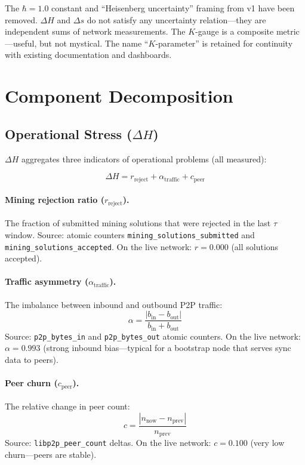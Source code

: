 \documentclass[11pt,a4paper]{article}
\begin{document}
\begin{honesty}
The $\hbar = 1.0$ constant and ``Heisenberg uncertainty'' framing from v1 have been removed. $\Delta H$ and $\Delta s$ do not satisfy any uncertainty relation---they are independent sums of network measurements. The $K$-gauge is a composite metric---useful, but not mystical. The name ``$K$-parameter'' is retained for continuity with existing documentation and dashboards.
\end{honesty}

\section{Component Decomposition}

\subsection{Operational Stress ($\Delta H$)}

$\Delta H$ aggregates three indicators of operational problems (\textcolor{measured}{all measured}):

\begin{equation}
\Delta H = r_{\text{reject}} + \alpha_{\text{traffic}} + c_{\text{peer}}
\end{equation}

\paragraph{Mining rejection ratio ($r_{\text{reject}}$).} The fraction of submitted mining solutions that were rejected in the last $\tau$ window. Source: atomic counters \texttt{mining\_solutions\_submitted} and \texttt{mining\_solutions\_accepted}. On the live network: $r = 0.000$ (all solutions accepted).

\paragraph{Traffic asymmetry ($\alpha_{\text{traffic}}$).} The imbalance between inbound and outbound P2P traffic:
\[
\alpha = \frac{|b_{\text{in}} - b_{\text{out}}|}{b_{\text{in}} + b_{\text{out}}}
\]
Source: \texttt{p2p\_bytes\_in} and \texttt{p2p\_bytes\_out} atomic counters. On the live network: $\alpha = 0.993$ (strong inbound bias---typical for a bootstrap node that serves sync data to peers).

\paragraph{Peer churn ($c_{\text{peer}}$).} The relative change in peer count:
\[
c = \frac{|n_{\text{now}} - n_{\text{prev}}|}{n_{\text{prev}}}
\]
Source: \texttt{libp2p\_peer\_count} deltas. On the live network: $c = 0.100$ (very low churn---peers are stable).
\end{document}
